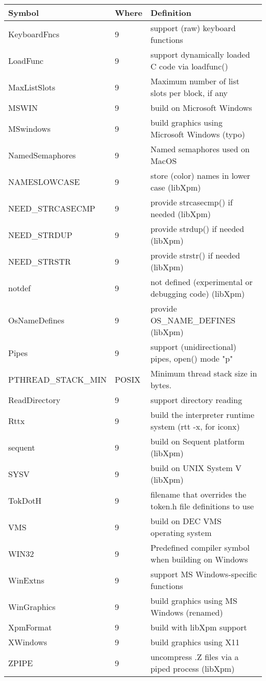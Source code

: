 \begin{xtabular}{|m{1.8in}|m{0.5in}|m{4.0in}|}
\hline
Symbol & Where & Definition \\ \hline
KeyboardFncs & 9 & support (raw) keyboard functions \\
LoadFunc & 9 & support dynamically loaded C code via loadfunc() \\
MaxListSlots & 9 & Maximum number of list slots per block, if any \\
MSWIN & 9 & build on Microsoft Windows \\
MSwindows & 9 & build graphics using Microsoft Windows (typo) \\
NamedSemaphores & 9 & Named semaphores used on MacOS \\
NAMESLOWCASE & 9 & store (color) names in lower case (libXpm) \\
NEED\_STRCASECMP & 9 & provide strcasecmp() if needed (libXpm) \\
NEED\_STRDUP & 9 & provide strdup() if needed (libXpm) \\
NEED\_STRSTR & 9 & provide strstr() if needed (libXpm) \\
notdef & 9 & not defined (experimental or debugging code) (libXpm) \\
OsNameDefines & 9 & provide OS\_NAME\_DEFINES (libXpm) \\
Pipes & 9 & support (unidirectional) pipes, open() mode "p" \\
PTHREAD\_STACK\_MIN & POSIX & Minimum thread stack size in bytes. \\
ReadDirectory & 9 & support directory reading \\
Rttx & 9 & build the interpreter runtime system (rtt -x, for iconx) \\
sequent & 9 & build on Sequent platform (libXpm) \\
SYSV & 9 & build on UNIX System V (libXpm) \\
TokDotH & 9 & filename that overrides the token.h file definitions to use \\
VMS & 9 & build on DEC VMS operating system \\
WIN32 & 9 & Predefined compiler symbol when building  on Windows \\
WinExtns & 9 & support MS Windows-specific functions \\
WinGraphics & 9 & build graphics using MS Windows (renamed) \\
XpmFormat & 9 & build with libXpm support \\
XWindows & 9 & build graphics using X11 \\
ZPIPE & 9 & uncompress .Z files via a piped process (libXpm) \\
\hline
\end{xtabular}
